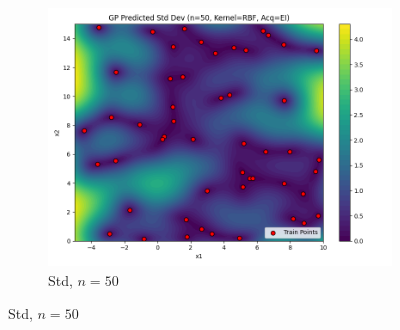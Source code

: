 \documentclass[a4paper,12pt]{article}
\begin{document}
\begin{figure}[H]
\begin{subfigure}{0.3\textwidth}
    \includegraphics[width=\linewidth]{Task-02/images/gp_std_rbf_n50_EI.png}
    \caption{Std, $n=50$}
\end{subfigure}


\end{figure}
\end{document}
